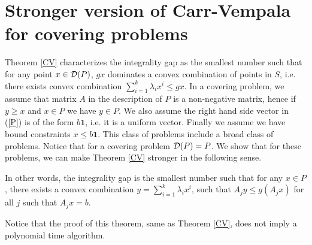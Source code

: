 \section{Stronger version of Carr-Vempala for covering problems} \label{gap}

Theorem \ref{CV} characterizes the integrality gap as the smallest number such that for any point $x\in \operatorname{\mathcal{D}}(P)$, $gx$ dominates a convex combination of points in $S$, i.e. there exists convex combination $\sum_{i=1}^{k}\lambda_ix^i \leq gx$.  In a covering problem, we assume that matrix $A$ in the description of $P$ is a non-negative matrix, hence if $y\geq x$ and $x\in P$ we have $y\in P$. We also assume the right hand side vector in (\ref{P}) is of the form $b\textbf{1}$, i.e. it is a uniform vector. Finally we assume we have bound constraints $x\leq b\textbf{1}$. This class of problems include a broad class of problems. Notice that for a covering problem $\operatorname{\mathcal{D}}(P)=P$.  We show that for these problems, we can make Theorem \ref{CV} stronger in the following sense. 

\tightcuts*

In other words, the integrality gap is the smallest number such that for any $x\in P$, there exists a convex combination $y=\sum_{i=1}^{k}\lambda_ix^i$, such that $A_jy\leq g(A_jx)$ for all $j$ such that $A_jx=b$. 

Notice that the proof of this theorem, same as Theorem \ref{CV}, does not imply a polynomial time algorithm.

